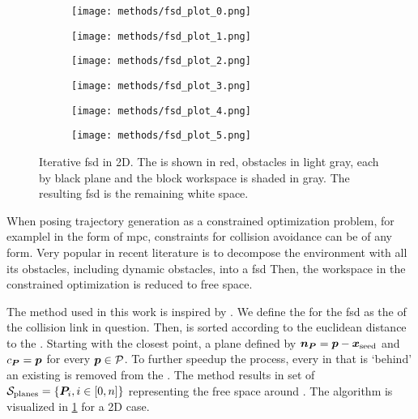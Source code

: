 \begin{figure}[h]
  \centering
  \begin{subfigure}{0.33\linewidth}
    \centering
    \texttt{[image: methods/fsd\_plot\_0.png]}
    \caption{}%
  \end{subfigure}%
  \begin{subfigure}{0.33\linewidth}
    \centering
    \texttt{[image: methods/fsd\_plot\_1.png]}
    \caption{}
  \end{subfigure}%
  \begin{subfigure}{0.33\linewidth}
    \centering
    \texttt{[image: methods/fsd\_plot\_2.png]}
    \caption{}
  \end{subfigure}
  \begin{subfigure}{0.33\linewidth}
    \centering
    \texttt{[image: methods/fsd\_plot\_3.png]}
    \caption{}
  \end{subfigure}%
  \begin{subfigure}{0.33\linewidth}
    \centering
    \texttt{[image: methods/fsd\_plot\_4.png]}
    \caption{}
  \end{subfigure}%
  \begin{subfigure}{0.33\linewidth}
    \centering
    \texttt{[image: methods/fsd\_plot\_5.png]}
    \caption{}
  \end{subfigure}%
  \caption{Iterative \acl{fsd} in 2D. The \seed{} is shown in red, obstacles in
    light gray, each \plane{} by black plane and the block workspace is shaded
    in gray. The resulting \acs{fsd} is the remaining white space.
  }%
  \label{fig:fsd}
\end{figure}

When posing trajectory generation as a constrained optimization problem, for
examplel in the form of \ac{mpc}, constraints for collision avoidance can be of
any form. Very popular in recent literature
\cite{Tordesillas2019,Liu2017a,Spahn2021} is to decompose the environment with
all its obstacles, including dynamic obstacles, into a \ac{fsd} Then, the
workspace in the constrained optimization is reduced to free space. 

The method used in this work is inspired by \cite{Liu2017a}. We define the
\seed{} for the \ac{fsd} as the \fk{} of the collision link in question. Then,
\pointcloud{} is sorted according to the euclidean distance to the \seed{}.
Starting with the closest point, a plane \plane{} defined by $\bm{n}_{\bm{P}} = \bm{p} -
\bm{x}_{\textrm{seed}}$ and $c_{\bm{P}} = \bm{p}$ for every $\bm{p} \in \mathcal{P}$. To further
speedup the process, every \point{} in \pointcloud{} that is `behind' an
existing \plane{} is removed from the \pointcloud{}. The method results in set
of $\mathcal{S}_{\textrm{planes}} = \{\bm{P}_i, i\in[0,n]\}$ representing the free
space around \seed{}. The algorithm is visualized in \cref{fig:fsd} for a 2D
case.

